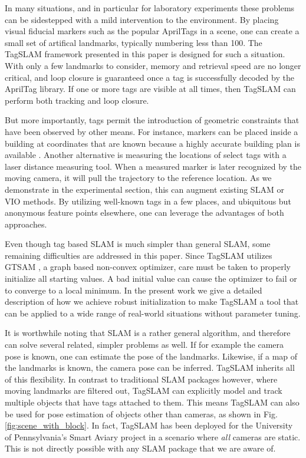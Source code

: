 In many situations, and in particular for laboratory experiments these
problems can be sidestepped with a mild intervention to the 
environment. By placing visual fiducial markers such as the
popular AprilTags \cite{wang2016} in a scene, one can create a small
set of artifical landmarks, typically numbering less than 100. The
TagSLAM framework presented in this paper is designed for such a situation.
With only a few landmarks to consider, memory and retrieval speed are
no longer critical, and loop closure is 
guaranteed once a tag is successfully decoded by the AprilTag
library. If one or more tags are visible at all times, then TagSLAM
can perform both tracking and loop closure.

But more importantly, tags permit the introduction of geometric
constraints that have been observed by other means. For instance, markers
can be placed inside a building at coordinates that are known because
a highly accurate building plan is available
\cite{pfrommer2017}. Another alternative is measuring the locations
of select tags with a laser distance measuring tool. When a measured
marker is later recognized by the moving camera, it will pull the
trajectory to the reference location. As we demonstrate in the
experimental section, this can augment existing SLAM or
VIO methods. By utilizing well-known tags in a few places, and
ubiquitous but anonymous feature points elsewhere, one can leverage
the advantages of both approaches.

Even though tag based SLAM is much simpler than general SLAM, some
remaining difficulties are addressed in this paper. Since TagSLAM
utilizes GTSAM  \cite{kaess2011}, a graph based non-convex optimizer, care must be taken
to properly initialize all starting values. A bad initial value can
cause the optimizer to fail or to converge to a local minimum. In the
present work we give a detailed description of how we achieve robust
initialization to make TagSLAM a tool that can be applied to a wide range of
real-world situations without parameter tuning.

It is worthwhile noting that SLAM is a rather general algorithm, and
therefore can solve several related, simpler problems as well. If for
example the camera pose is known, one can estimate the pose of the
landmarks. Likewise, if a map of the landmarks is known, the camera
pose can be inferred. TagSLAM inherits all of this flexibility. In
contrast to traditional SLAM packages however, where moving landmarks
are filtered out, TagSLAM can explicitly model and track multiple
objects that have tags attached to them. This means TagSLAM can also
be used for pose estimation of objects other than cameras, as shown in
Fig. \ref{fig:scene_with_block}. In fact, TagSLAM has been deployed for
the University of Pennsylvania's Smart Aviary project in a scenario
where {\em all} cameras are static. This is not directly possible with any SLAM
package that we are aware of.


